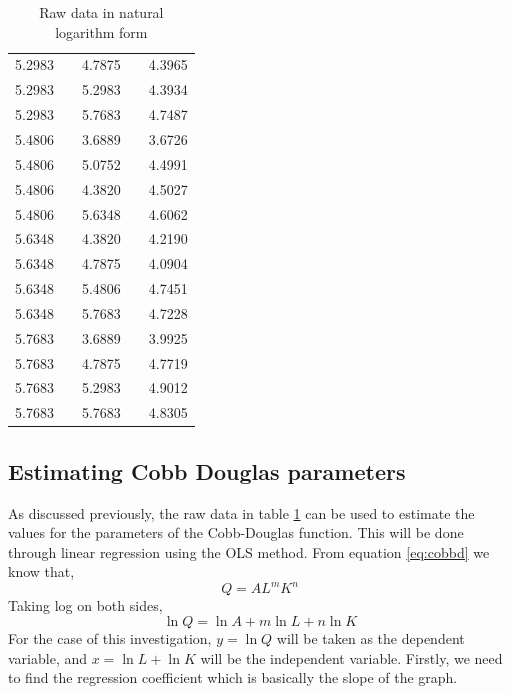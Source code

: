 \documentclass[a4paper,12pt]{article}
\theoremstyle{definition}
\begin{document}
\begin{table}[H]
\begin{center}
\begin{tabular}{|lllll|}
								    5.2983 &       &   4.7875    &       &   4.3965 \\
                                    5.2983 &       &  5.2983     &       &    4.3934 \\
                                    5.2983 &      &   5.7683    &       &     4.7487 \\
                                    5.4806 &       &   3.6889  &       &    3.6726 \\
                                    5.4806 &      &    5.0752   &       &   4.4991  \\ 
                                    5.4806 &      &   4.3820   &      &  4.5027  \\
                                    5.4806 &      &    5.6348   &       &   4.6062  \\
                                    5.6348 &      &    4.3820   &      &    4.2190 \\
                                    5.6348 &      &    4.7875   &       &   4.0904  \\
                                    5.6348 &       &    5.4806   &       & 4.7451  \\ 
                                    5.6348 &      &    5.7683   &       &  4.7228 \\
                                    5.7683 &      &    3.6889   &      &  3.9925  \\
                                    5.7683 &      &   4.7875    &      &  4.7719  \\
                                    5.7683 &       &    5.2983   &       &  4.9012  \\
                                    5.7683 &       &     5.7683  &      &   4.8305 \\ \bottomrule
\end{tabular}
\caption{Raw data in natural logarithm form}
\label{tab:rawdata}
\end{center}
\end{table}


\subsection{Estimating Cobb Douglas parameters}
As discussed previously, the raw data in table \ref{tab:rawdata} can be used to estimate the values for the parameters of the Cobb-Douglas function. This will be done through linear regression using the OLS method. From equation \eqref{eq:cobbd} we know that,
\begin{equation}
	Q=AL^mK^n
\end{equation}
Taking log on both sides,
\begin{equation}\label{eq:logcobbd}
	\ln Q=\ln A+ m \ln L + n \ln K
\end{equation}
For the case of this investigation, $y = \ln Q$ will be taken as the dependent variable, and $x= \ln L + \ln K$ will be the independent variable. Firstly, we need to find the regression coefficient which is basically the slope of the graph.
\end{document}
